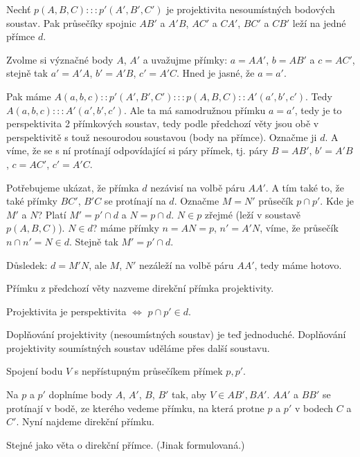 \documentclass[12pt]{article}					%
\begin{document}
\begin{veta}
	Nechť $p(A, B, C) ::: p'(A', B', C')$ je projektivita nesoumístných bodových soustav. Pak průsečíky spojnic $AB'$ a $A'B$, $AC'$ a $CA'$, $BC'$ a $CB'$ leží na jedné přímce $d$.

	\begin{dukazin}
		Zvolme si význačné body $A$, $A'$ a uvažujme přímky: $a = AA'$, $b = AB'$ a $c = AC'$, stejně tak $a' = A'A$, $b' = A'B$, $c' = A'C$. Hned je jasné, že $a = a'$.

		Pak máme $A(a, b, c)::p'(A', B', C'):::p(A, B, C)::A'(a', b', c')$. Tedy $A(a, b, c):::A'(a', b', c')$. Ale ta má samodružnou přímku $a = a'$, tedy je to perspektivita 2 přímkových soustav, tedy podle předchozí věty jsou obě v perspektivitě s touž nesourodou soustavou (body na přímce). Označme ji $d$. A víme, že se s ní protínají odpovídající si páry přímek, tj. páry $B = AB'$, $b' = A'B$, $c = AC'$, $c' = A'C$.

		Potřebujeme ukázat, že přímka $d$ nezávisí na volbě páru $AA'$. A tím také to, že také přímky $BC'$, $B'C$ se protínají na $d$. Označme $M = N'$ průsečík $p \cap p'$. Kde je $M'$ a $N$? Platí $M' = p' \cap d$ a $N = p \cap d$. $N \in p$ zřejmé (leží v soustavě $p(A, B, C)$). $N \in d$? máme přímky $n = AN = p$, $n' = A'N$, víme, že průsečík $n \cap n' = N \in d$. Stejně tak $M' = p' \cap d$.

		Důsledek: $d = M'N$, ale $M$, $N'$ nezáleží na volbě páru $AA'$, tedy máme hotovo.
	\end{dukazin}
\end{veta}

\begin{definice}
	Přímku z předchozí věty nazveme direkční přímka projektivity.
\end{definice}

\begin{poznamka}
	Projektivita je perspektivita $\Leftrightarrow$ $p \cap p' \in d$.
\end{poznamka}

\begin{priklad}
	Doplňování projektivity (nesoumístných soustav) je teď jednoduché. Doplňování projektivity soumístných soustav uděláme přes další soustavu.
\end{priklad}

\begin{priklad}
	Spojení bodu $V$ s nepřístupným průsečíkem přímek $p, p'$.

	\begin{reseni}
		Na $p$ a $p'$ doplníme body $A$, $A'$, $B$, $B'$ tak, aby $V \in AB', BA'$. $AA'$ a $BB'$ se protínají v bodě, ze kterého vedeme přímku, na která protne $p$ a $p'$ v bodech $C$ a $C'$. Nyní najdeme direkční přímku.
	\end{reseni}
\end{priklad}

\begin{veta}
	Stejné jako věta o direkční přímce. (Jinak formulovaná.)
\end{veta}
\end{document}

